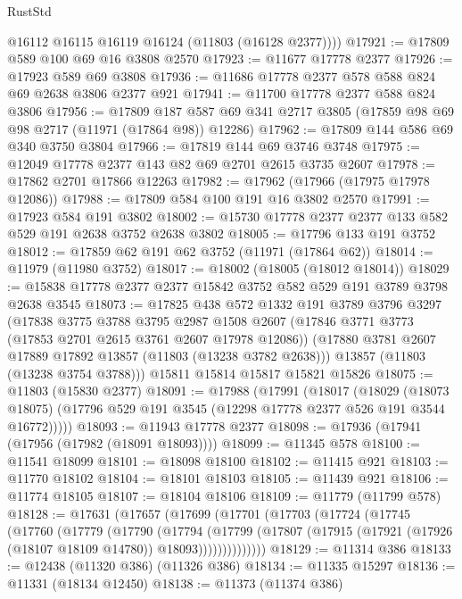 \begin{lexlean}{RustStd}
\begin{coremodule}
        @16112
        @16115
        @16119
        @16124
        (@11803 (@16128 @2377))))
@17921 := @17809 @589 @100 @69 @16 @3808 @2570
@17923 := @11677 @17778 @2377
@17926 := @17923 @589 @69 @3808
@17936 := @11686 @17778 @2377 @578 @588 @824 @69 @2638 @3806 @2377 @921
@17941 := @11700 @17778 @2377 @588 @824 @3806
@17956 := @17809
    @187
    @587
    @69
    @341
    @2717
    @3805
    (@17859 @98 @69 @98 @2717 (@11971 (@17864 @98)) @12286)
@17962 := @17809 @144 @586 @69 @340 @3750 @3804
@17966 := @17819 @144 @69 @3746 @3748
@17975 := @12049 @17778 @2377 @143 @82 @69 @2701 @2615 @3735 @2607
@17978 := @17862 @2701 @17866 @12263
@17982 := @17962 (@17966 (@17975 @17978 @12086))
@17988 := @17809 @584 @100 @191 @16 @3802 @2570
@17991 := @17923 @584 @191 @3802
@18002 := @15730 @17778 @2377 @2377 @133 @582 @529 @191 @2638 @3752 @2638 @3802
@18005 := @17796 @133 @191 @3752
@18012 := @17859 @62 @191 @62 @3752 (@11971 (@17864 @62))
@18014 := @11979 (@11980 @3752)
@18017 := @18002 (@18005 (@18012 @18014))
@18029 := @15838 @17778 @2377 @2377 @15842 @3752 @582 @529 @191 @3789 @3798 @2638 @3545
@18073 := @17825
    @438
    @572
    @1332
    @191
    @3789
    @3796
    @3297
    (@17838
      @3775
      @3788
      @3795
      @2987
      @1508
      @2607
      (@17846 @3771 @3773 (@17853 @2701 @2615 @3761 @2607 @17978 @12086))
      (@17880 @3781 @2607 @17889 @17892 @13857 (@11803 (@13238 @3782 @2638)))
      @13857
      (@11803 (@13238 @3754 @3788)))
    @15811
    @15814
    @15817
    @15821
    @15826
@18075 := @11803 (@15830 @2377)
@18091 := @17988
    (@17991
      (@18017
        (@18029
          (@18073 @18075)
          (@17796 @529 @191 @3545 (@12298 @17778 @2377 @526 @191 @3544 @16772)))))
@18093 := @11943 @17778 @2377
@18098 := @17936 (@17941 (@17956 (@17982 (@18091 @18093))))
@18099 := @11345 @578
@18100 := @11541 @18099
@18101 := @18098 @18100
@18102 := @11415 @921
@18103 := @11770 @18102
@18104 := @18101 @18103
@18105 := @11439 @921
@18106 := @11774 @18105
@18107 := @18104 @18106
@18109 := @11779 (@11799 @578)
@18128 := @17631
    (@17657
      (@17699
        (@17701
          (@17703
            (@17724
              (@17745
                (@17760
                  (@17779
                    (@17790
                      (@17794
                        (@17799
                          (@17807
                            (@17915 (@17921 (@17926 (@18107 @18109 @14780)) @18093))))))))))))))
@18129 := @11314 @386
@18133 := @12438 (@11320 @386) (@11326 @386)
@18134 := @11335 @15297
@18136 := @11331 (@18134 @12450)
@18138 := @11373 (@11374 @386)

\end{coremodule}
\end{lexlean}
